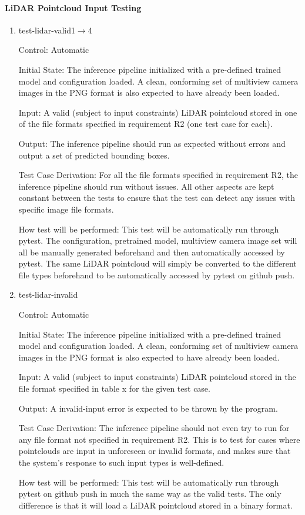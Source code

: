 \documentclass[12pt, titlepage]{article}
\begin{document}
\paragraph{LiDAR Pointcloud Input Testing}

\begin{enumerate}

\item{test-lidar-valid1$\rightarrow$4\\}

Control: Automatic
					
Initial State: The inference pipeline initialized with a pre-defined trained model and configuration loaded. A clean, conforming set of multiview camera images in the PNG format
is also expected to have already been loaded.
					
Input: A valid (subject to input constraints) LiDAR pointcloud stored in one of the file formats specified in requirement R2 (one test case for each).
					
Output: The inference pipeline should run as expected without errors and output a set of predicted bounding boxes.

Test Case Derivation: For all the file formats specified in requirement R2, the inference pipeline should run without issues. All other aspects are kept
constant between the tests to ensure that the test can detect any issues with specific image file formats.
					
How test will be performed: This test will be automatically run through pytest. The configuration, pretrained model, multiview camera image set will all be manually generated beforehand
and then automatically accessed by pytest. The same LiDAR pointcloud will simply be converted to the different file types beforehand to be automatically accessed
by pytest on github push.
					
\item{test-lidar-invalid\\}

Control: Automatic
					
Initial State: The inference pipeline initialized with a pre-defined trained model and configuration loaded. A clean, conforming set of multiview camera images in the PNG format
is also expected to have already been loaded.
					
Input: A valid (subject to input constraints) LiDAR pointcloud stored in the file format specified in table x for the given test case.
					
Output: A invalid-input error is expected to be thrown by the program.

Test Case Derivation: The inference pipeline should not even try to run for any file format not specified in requirement R2. This is to test for cases
where pointclouds are input in unforeseen or invalid formats, and makes sure that the system's response to such input types is well-defined. 

How test will be performed: This test will be automatically run through pytest on github push in much the same way as the valid tests. The only difference is that it will
load a LiDAR pointcloud stored in a binary format.

\end{enumerate}
\end{document}
